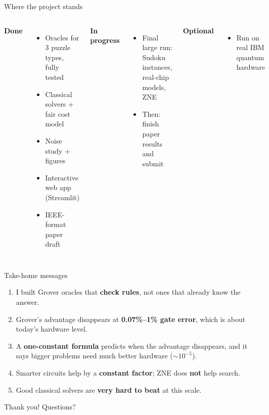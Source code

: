 \documentclass[aspectratio=169,11pt]{beamer}
\begin{document}
\begin{frame}{Where the project stands}
\begin{columns}[T]
\textbf{Done}
\begin{itemize}
\item Oracles for 3 puzzle types, fully tested
\item Classical solvers + fair cost model
\item Noise study + figures
\item Interactive web app (Streamlit)
\item IEEE-format paper draft
\end{itemize}
\textbf{In progress}
\begin{itemize}
\item Final large run: Sudoku instances, real-chip models, ZNE
\item Then: finish paper results and submit
\end{itemize}
\vspace{0.5em}
\textbf{Optional}
\begin{itemize}
\item Run on real IBM quantum hardware
\end{itemize}
\end{columns}
\end{frame}

\begin{frame}{Take-home messages}
\begin{enumerate}
\item I built Grover oracles that \textbf{check rules}, not ones that already know the answer.
\item Grover's advantage disappears at \textbf{0.07\%--1\% gate error}, which is about today's hardware level.
\item A \textbf{one-constant formula} predicts when the advantage disappears, and it says bigger problems need much better hardware ($\sim10^{-5}$).
\item Smarter circuits help by a \textbf{constant factor}; ZNE does \textbf{not} help search.
\item Good classical solvers are \textbf{very hard to beat} at this scale.
\end{enumerate}
\vspace{1em}
\begin{center}
\Large Thank you! Questions?
\end{center}
\end{frame}
\end{document}
